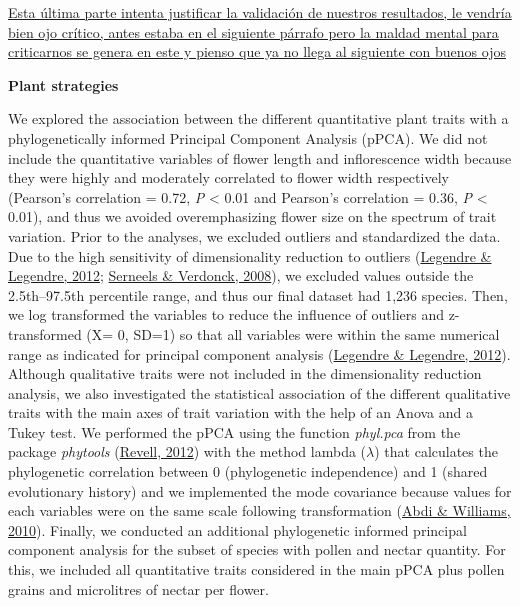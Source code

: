 \documentclass[
  12pt,
  a4paper,
]{article}
\begin{document}
\href{Jose}{Esta última parte intenta justificar la validación de nuestros resultados, le vendría bien ojo crítico, antes estaba en el siguiente párrafo pero la maldad mental para criticarnos se genera en este y pienso que ya no llega al siguiente con buenos ojos}

\textbf{Plant strategies}

We explored the association between the different quantitative plant traits with a phylogenetically informed Principal Component Analysis (pPCA). We did not include the quantitative variables of flower length and inflorescence width because they were highly and moderately correlated to flower width respectively (Pearson's correlation = 0.72, \emph{P} \textless{} 0.01 and Pearson's correlation = 0.36, \emph{P} \textless{} 0.01), and thus we avoided overemphasizing flower size on the spectrum of trait variation. Prior to the analyses, we excluded outliers and standardized the data. Due to the high sensitivity of dimensionality reduction to outliers (\protect\hyperlink{ref-legendre2012}{Legendre \& Legendre, 2012}; \protect\hyperlink{ref-serneels2008}{Serneels \& Verdonck, 2008}), we excluded values outside the 2.5th--97.5th percentile range, and thus our final dataset had 1,236 species. Then, we log transformed the variables to reduce the influence of outliers and z-transformed (X= 0, SD=1) so that all variables were within the same numerical range as indicated for principal component analysis (\protect\hyperlink{ref-legendre2012}{Legendre \& Legendre, 2012}). Although qualitative traits were not included in the dimensionality reduction analysis, we also investigated the statistical association of the different qualitative traits with the main axes of trait variation with the help of an Anova and a Tukey test. We performed the pPCA using the function \emph{phyl.pca} from the package \emph{phytools} (\protect\hyperlink{ref-revell2012}{Revell, 2012}) with the method lambda (\(\lambda\)) that calculates the phylogenetic correlation between 0 (phylogenetic independence) and 1 (shared evolutionary history) and we implemented the mode covariance because values for each variables were on the same scale following transformation (\protect\hyperlink{ref-abdi2010}{Abdi \& Williams, 2010}). Finally, we conducted an additional phylogenetic informed principal component analysis for the subset of species with pollen and nectar quantity. For this, we included all quantitative traits considered in the main pPCA plus pollen grains and microlitres of nectar per flower.
\end{document}
